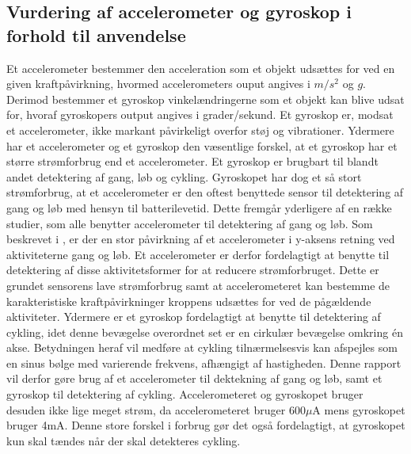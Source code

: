\subsection{Vurdering af accelerometer og gyroskop i forhold til anvendelse}\label{acc_og_gyro}
Et accelerometer bestemmer den acceleration som et objekt udsættes for ved en given kraftpåvirkning, hvormed accelerometers ouput angives i $m/s^2$ og $g$. Derimod bestemmer et gyroskop vinkelændringerne som et objekt kan blive udsat for, hvoraf gyroskopers output angives i grader/sekund. Et gyroskop er, modsat et accelerometer, ikke markant påvirkeligt overfor støj og vibrationer. \citep{Goodrich2013,TittertonWeston2004,LuingeVeltink2005} \newline
Ydermere har et accelerometer og et gyroskop den væsentlige forskel, at et gyroskop har et større strømforbrug end et accelerometer.  Et gyroskop er brugbart til blandt andet detektering af gang, løb og cykling. Gyroskopet har dog et så stort strømforbrug, at et accelerometer er den oftest benyttede sensor til detektering af gang og løb med hensyn til batterilevetid. Dette fremgår yderligere af en række studier, som alle benytter accelerometer til detektering af gang og løb. \citep{Rueterbories2010,Sparkfun,ClelandKikhia2013} \newline
Som beskrevet i , er der en stor påvirkning af et accelerometer i y-aksens retning ved aktiviteterne gang og løb. Et accelerometer er derfor fordelagtigt at benytte til detektering af disse aktivitetsformer for at reducere strømforbruget. Dette er grundet sensorens lave strømforbrug samt at accelerometeret kan bestemme de karakteristiske kraftpåvirkninger kroppens udsættes for ved de pågældende aktiviteter. Ydermere er et gyroskop fordelagtigt at benytte til detektering af cykling, idet denne bevægelse overordnet set er en cirkulær bevægelse omkring én akse. Betydningen heraf vil medføre at cykling tilnærmelsesvis kan afspejles som en sinus bølge med varierende frekvens, afhængigt af hastigheden. \newline
Denne rapport vil derfor gøre brug af et accelerometer til dektekning af gang og løb, samt et gyroskop til detektering af cykling. Accelerometeret og gyroskopet bruger desuden ikke lige meget strøm, da accelerometeret bruger 600$\mu$A mens gyroskopet bruger 4mA. Denne store forskel i forbrug gør det også fordelagtigt, at gyroskopet kun skal tændes når der skal detekteres cykling.

